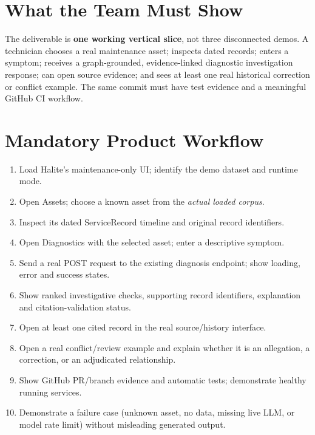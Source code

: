 \documentclass[11pt,a4paper,oneside]{report}
\begin{document}
\section{What the Team Must Show}
The deliverable is \textbf{one working vertical slice}, not three disconnected demos. A technician chooses a real maintenance asset; inspects dated records; enters a symptom; receives a graph-grounded, evidence-linked diagnostic investigation response; can open source evidence; and sees at least one real historical correction or conflict example. The same commit must have test evidence and a meaningful GitHub CI workflow.

\section{Mandatory Product Workflow}
\begin{enumerate}
\item Load Halite's maintenance-only UI; identify the demo dataset and runtime mode.
\item Open Assets; choose a known asset from the \emph{actual loaded corpus}.
\item Inspect its dated ServiceRecord timeline and original record identifiers.
\item Open Diagnostics with the selected asset; enter a descriptive symptom.
\item Send a real POST request to the existing diagnosis endpoint; show loading, error and success states.
\item Show ranked investigative checks, supporting record identifiers, explanation and citation-validation status.
\item Open at least one cited record in the real source/history interface.
\item Open a real conflict/review example and explain whether it is an allegation, a correction, or an adjudicated relationship.
\item Show GitHub PR/branch evidence and automatic tests; demonstrate healthy running services.
\item Demonstrate a failure case (unknown asset, no data, missing live LLM, or model rate limit) without misleading generated output.
\end{enumerate}
\end{document}
